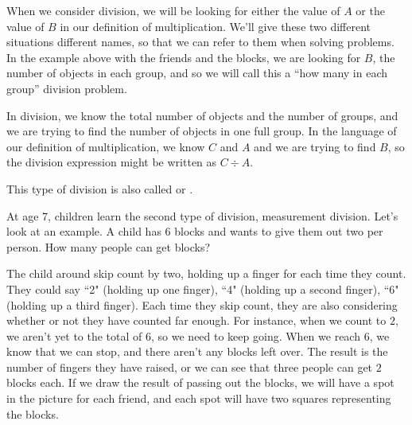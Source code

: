 \documentclass{ximera}
\begin{document}
When we consider division, we will be looking for either the value of $A$ or the value of $B$ in our definition of multiplication. We'll give these two different situations different names, so that we can refer to them when solving problems. In the example above with the friends and the blocks, we are looking for $B$, the number of objects in each group, and so we will call this a ``how many in each group'' division problem.

\begin{definition}
In  division, we know the total number of objects and the number of groups, and we are trying to find the number of objects in one full group. In the language of our definition of multiplication, we know $C$ and $A$ and we are trying to find $B$, so the division expression might be written as $C \div A$.
\begin{image}
\end{image}

This type of division is also called  or .
\end{definition}

At age 7, children learn the second type of division, measurement division. Let's look at an example. A child has $6$ blocks and wants to give them out two per person. How many people can get blocks? 

The child around skip count by two, holding up a finger for each time they count. They could say ``2" (holding up one finger), ``4" (holding up a second finger), ``6" (holding up a third finger). Each time they skip count, they are also considering whether or not they have counted far enough. For instance, when we count to $2$, we aren't yet to the total of $6$, so we need to keep going. When we reach $6$, we know that we can stop, and there aren't any blocks left over. The result is the number of fingers they have raised, or we can see that three people can get $2$ blocks each. If we draw the result of passing out the blocks, we will have a spot in the picture for each friend, and each spot will have two squares representing the blocks.
\begin{image}
\end{image}
\end{document}
